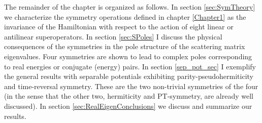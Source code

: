 The remainder of the chapter is organized as follows. In section \ref{sec:SymTheory} we characterize the symmetry operations defined in chapter \ref{Chapter1} as the invariance of the Hamiltonian with respect to the action of eight linear or antilinear superoperators. In section \ref{sec:SPoles} I discuss the physical consequences of the symmetries in the pole structure of the scattering matrix eigenvalues. Four symmetries are shown to lead to complex poles corresponding to real energies or conjugate (energy) pairs.  In section \ref{sep_pot_sec} I exemplify the general results with separable potentials exhibiting parity-pseudohermiticity and time-reversal symmetry. These are the two non-trivial symmetries of the four (in the sense that the other two, hermiticity and PT-symmetry, are already well discussed). In section \ref{sec:RealEigenConclusions} we discuss and summarize our results.
